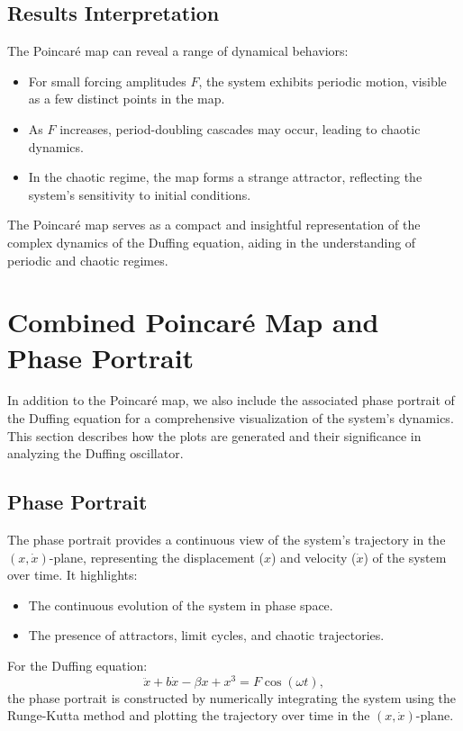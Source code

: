 \documentclass[11pt]{article}
\begin{document}
\subsection*{Results Interpretation}
The Poincaré map can reveal a range of dynamical behaviors:
\begin{itemize}
    \item For small forcing amplitudes \(F\), the system exhibits periodic motion, visible as a few distinct points in the map.
    \item As \(F\) increases, period-doubling cascades may occur, leading to chaotic dynamics.
    \item In the chaotic regime, the map forms a strange attractor, reflecting the system's sensitivity to initial conditions.
\end{itemize}

The Poincaré map serves as a compact and insightful representation of the complex dynamics of the Duffing equation, aiding in the understanding of periodic and chaotic regimes.

\section*{Combined Poincaré Map and Phase Portrait}
In addition to the Poincaré map, we also include the associated phase portrait of the Duffing equation for a comprehensive visualization of the system's dynamics. This section describes how the plots are generated and their significance in analyzing the Duffing oscillator.

\subsection*{Phase Portrait}
The phase portrait provides a continuous view of the system's trajectory in the \((x, \dot{x})\)-plane, representing the displacement (\(x\)) and velocity (\(\dot{x}\)) of the system over time. It highlights:
\begin{itemize}
    \item The continuous evolution of the system in phase space.
    \item The presence of attractors, limit cycles, and chaotic trajectories.
\end{itemize}

For the Duffing equation:
\[
\ddot{x} + b \dot{x} - \beta x + x^3 = F \cos(\omega t),
\]
the phase portrait is constructed by numerically integrating the system using the Runge-Kutta method and plotting the trajectory over time in the \((x, \dot{x})\)-plane.
\end{document}
